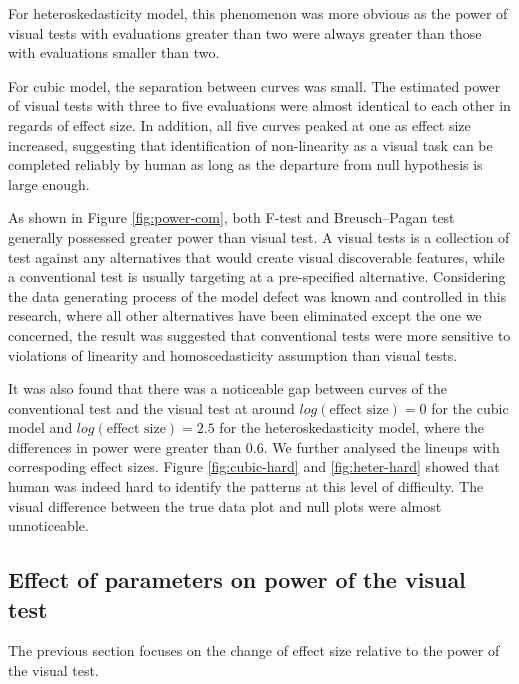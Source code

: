\documentclass[]{interact}
\theoremstyle{plain}%
\theoremstyle{definition}
\theoremstyle{remark}
\begin{document}
For heteroskedasticity model, this phenomenon was more obvious as the
power of visual tests with evaluations greater than two were always
greater than those with evaluations smaller than two.

For cubic model, the separation between curves was small. The estimated
power of visual tests with three to five evaluations were almost
identical to each other in regards of effect size. In addition, all five
curves peaked at one as effect size increased, suggesting that
identification of non-linearity as a visual task can be completed
reliably by human as long as the departure from null hypothesis is large
enough.

As shown in Figure \ref{fig:power-com}, both F-test and Breusch--Pagan
test generally possessed greater power than visual test. A visual tests
is a collection of test against any alternatives that would create
visual discoverable features, while a conventional test is usually
targeting at a pre-specified alternative. Considering the data
generating process of the model defect was known and controlled in this
research, where all other alternatives have been eliminated except the
one we concerned, the result was suggested that conventional tests were
more sensitive to violations of linearity and homoscedasticity
assumption than visual tests.

It was also found that there was a noticeable gap between curves of the
conventional test and the visual test at around
\(log(\text{effect size}) = 0\) for the cubic model and
\(log(\text{effect size}) = 2.5\) for the heteroskedasticity model,
where the differences in power were greater than 0.6. We further
analysed the lineups with correspoding effect sizes. Figure
\ref{fig:cubic-hard} and \ref{fig:heter-hard} showed that human was
indeed hard to identify the patterns at this level of difficulty. The
visual difference between the true data plot and null plots were almost
unnoticeable.

\hypertarget{effect-of-parameters-on-power-of-the-visual-test}{%
\subsection{Effect of parameters on power of the visual
test}\label{effect-of-parameters-on-power-of-the-visual-test}}

The previous section focuses on the change of effect size relative to
the power of the visual test.
\end{document}
